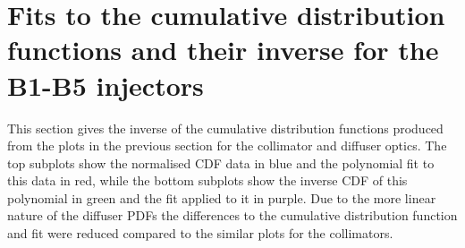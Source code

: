 \section{Fits to the cumulative distribution functions and their inverse for the B1-B5 injectors}

This section gives the inverse of the cumulative distribution functions produced from the plots in the previous section for the collimator and diffuser optics. The top subplots show the normalised CDF data in blue and the polynomial fit to this data in red, while the bottom subplots show the inverse CDF of this polynomial in green and the fit applied to it in purple. Due to the more linear nature of the diffuser PDFs the differences to the cumulative distribution function and fit were reduced compared to the similar plots for the collimators. 


